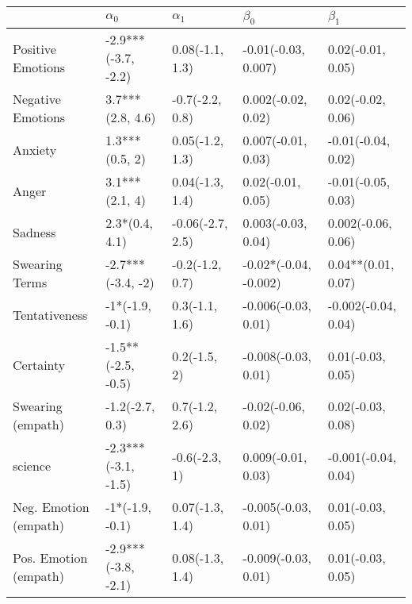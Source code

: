 \begin{tabular}{lllll}
\toprule
{} &           $\alpha_0$ &        $\alpha_1$ &              $\beta_0$ &            $\beta_1$ \\
\midrule
Positive Emotions     &  -2.9***(-3.7, -2.2) &   0.08(-1.1, 1.3) &    -0.01(-0.03, 0.007) &    0.02(-0.01, 0.05) \\
Negative Emotions     &     3.7***(2.8, 4.6) &   -0.7(-2.2, 0.8) &     0.002(-0.02, 0.02) &    0.02(-0.02, 0.06) \\
Anxiety               &       1.3***(0.5, 2) &   0.05(-1.2, 1.3) &     0.007(-0.01, 0.03) &   -0.01(-0.04, 0.02) \\
Anger                 &       3.1***(2.1, 4) &   0.04(-1.3, 1.4) &      0.02(-0.01, 0.05) &   -0.01(-0.05, 0.03) \\
Sadness               &       2.3*(0.4, 4.1) &  -0.06(-2.7, 2.5) &     0.003(-0.03, 0.04) &   0.002(-0.06, 0.06) \\
Swearing Terms        &    -2.7***(-3.4, -2) &   -0.2(-1.2, 0.7) &  -0.02*(-0.04, -0.002) &   0.04**(0.01, 0.07) \\
Tentativeness         &      -1*(-1.9, -0.1) &    0.3(-1.1, 1.6) &    -0.006(-0.03, 0.01) &  -0.002(-0.04, 0.04) \\
Certainty             &   -1.5**(-2.5, -0.5) &      0.2(-1.5, 2) &    -0.008(-0.03, 0.01) &    0.01(-0.03, 0.05) \\
Swearing (empath)     &      -1.2(-2.7, 0.3) &    0.7(-1.2, 2.6) &     -0.02(-0.06, 0.02) &    0.02(-0.03, 0.08) \\
science               &  -2.3***(-3.1, -1.5) &     -0.6(-2.3, 1) &     0.009(-0.01, 0.03) &  -0.001(-0.04, 0.04) \\
Neg. Emotion (empath) &      -1*(-1.9, -0.1) &   0.07(-1.3, 1.4) &    -0.005(-0.03, 0.01) &    0.01(-0.03, 0.05) \\
Pos. Emotion (empath) &  -2.9***(-3.8, -2.1) &   0.08(-1.3, 1.4) &    -0.009(-0.03, 0.01) &    0.01(-0.03, 0.05) \\
\bottomrule
\end{tabular}
